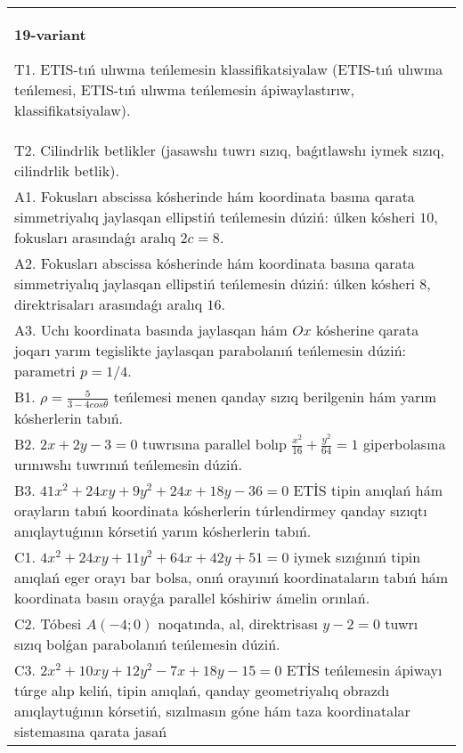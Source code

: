 \documentclass{article}
\begin{document}
\begin{tabular}{m{17cm}}
\textbf{19-variant}
\newline

T1. ETIS-tıń ulıwma teńlemesin klassifikatsiyalaw (ETIS-tıń ulıwma teńlemesi, ETIS-tıń ulıwma teńlemesin ápiwaylastırıw, klassifikatsiyalaw).\\

T2. Cilindrlik betlikler (jasawshı tuwrı sızıq, baǵıtlawshı iymek sızıq, cilindrlik betlik).\\

A1. Fokusları abscissa kósherinde hám koordinata basına qarata simmetriyalıq jaylasqan ellipstiń teńlemesin dúziń: úlken kósheri $10$, fokusları arasındaǵı aralıq $2 c=8$.\\

A2. Fokusları abscissa kósherinde hám koordinata basına qarata simmetriyalıq jaylasqan ellipstiń teńlemesin dúziń: úlken kósheri $8$, direktrisaları arasındaǵı aralıq $16$.\\

A3. Uchı koordinata basında jaylasqan hám $Ox$ kósherine qarata joqarı yarım tegislikte jaylasqan parabolanıń teńlemesin dúziń: parametri $p=1/4$.\\

B1. $\rho = \frac{5}{3 - 4cos\theta}$ teńlemesi menen qanday sızıq berilgenin hám yarım kósherlerin tabıń.  \\

B2. $2x + 2y - 3 = 0$ tuwrısına parallel bolıp $\frac{x^{2}}{16} + \frac{y^{2}}{64} = 1$ giperbolasına urınıwshı tuwrınıń teńlemesin dúziń.  \\

B3. $41x^{2} + 24xy + 9y^{2} + 24x + 18y - 36 = 0$ ETİS tipin anıqlań hám orayların tabıń koordinata kósherlerin túrlendirmey qanday sızıqtı anıqlaytuǵının kórsetiń yarım kósherlerin tabıń.  \\

C1. $4x^{2} + 24xy + 11y^{2} + 64x + 42y + 51 = 0$ iymek sızıǵınıń tipin anıqlań eger orayı bar bolsa, onıń orayınıń koordinataların tabıń hám koordinata basın orayǵa parallel kóshiriw ámelin orınlań.  \\

C2. Tóbesi $A(-4;0)$ noqatında, al, direktrisası $y - 2 = 0$ tuwrı sızıq bolǵan parabolanıń teńlemesin dúziń.\\

C3. $2x^{2} + 10xy + 12y^{2} - 7x + 18y - 15 = 0$ ETİS teńlemesin ápiwayı túrge alıp keliń, tipin anıqlań, qanday geometriyalıq obrazdı anıqlaytuǵının kórsetiń, sızılmasın góne hám taza koordinatalar sistemasına qarata jasań  \\

\end{tabular}
\vspace{1cm}
\end{document}
